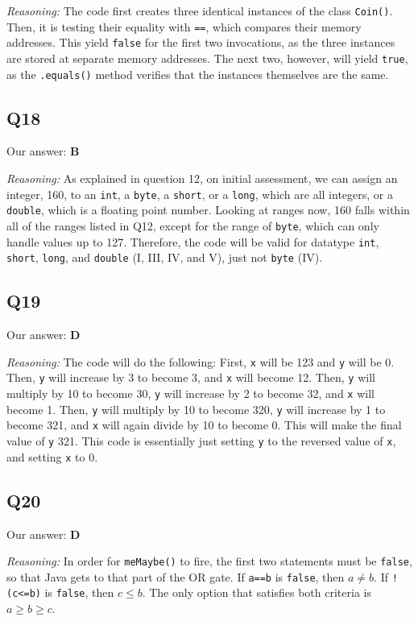 \documentclass{article}
\begin{document}
\noindent\textit{Reasoning:} The code first creates three identical instances of the class \verb|Coin()|. Then, it is testing their equality with \verb|==|, which compares their memory addresses. This yield \verb|false| for the first two invocations, as the three instances are stored at separate memory addresses. The next two, however, will yield \verb|true|, as the \verb|.equals()| method verifies that the instances themselves are the same.

\subsection{Q18}

Our answer: \textbf{B}

\noindent\textit{Reasoning:} As explained in question 12, on initial assessment, we can assign an integer, 160, to an \verb|int|, a \verb|byte|, a \verb|short|, or a \verb|long|, which are all integers, or a \verb|double|, which is a floating point number. Looking at ranges now, 160 falls within all of the ranges listed in Q12, except for the range of \verb|byte|, which can only handle values up to 127. Therefore, the code will be valid for datatype \verb|int|, \verb|short|, \verb|long|, and \verb|double| (I, III, IV, and V), just not \verb|byte| (IV).

\subsection{Q19}

Our answer: \textbf{D}

\noindent\textit{Reasoning:} The code will do the following:
First, \verb|x| will be 123 and \verb|y| will be 0. Then, \verb|y| will increase by 3 to become 3, and \verb|x| will become 12. Then, \verb|y| will multiply by 10 to become 30, \verb|y| will increase by 2 to become 32, and \verb|x| will become 1. Then, \verb|y| will multiply by 10 to become 320, \verb|y| will increase by 1 to become 321, and \verb|x| will again divide by 10 to become 0. This will make the final value of \verb|y| 321. This code is essentially just setting \verb|y| to the reversed value of \verb|x|, and setting \verb|x| to 0.

\subsection{Q20}

Our answer: \textbf{D}

\noindent\textit{Reasoning:} In order for \verb|meMaybe()| to fire, the first two statements must be \verb|false|, so that Java gets to that part of the OR gate. If \verb|a==b| is \verb|false|, then \(a \neq b\). If \verb|!(c<=b)| is \verb|false|, then \(c \leq b\). The only option that satisfies both criteria is \(a \geq b \geq c\).
\end{document}
